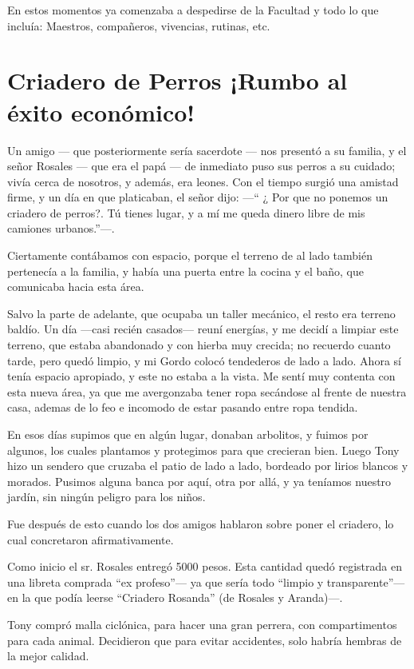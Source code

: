 \documentclass[letterpaper, 12pt]{book}
\begin{document}
En estos momentos ya comenzaba a despedirse de la Facultad y todo lo que incluía: Maestros, compañeros, vivencias, rutinas, etc.

\chapter{Criadero de Perros ¡Rumbo al éxito económico!}
Un amigo --- que posteriormente sería sacerdote --- nos presentó a su familia, y el señor Rosales --- que era el papá --- de inmediato puso sus perros a su cuidado; vivía cerca de nosotros, y además, era leones. Con el tiempo surgió una amistad firme, y un día en  que platicaban, el señor dijo: ---`` ¿ Por que no ponemos un criadero de perros?. Tú tienes lugar, y a mí me queda dinero libre de mis camiones urbanos.''---.

Ciertamente contábamos con espacio, porque el terreno de al lado también pertenecía a la familia, y había una puerta entre la cocina y el baño, que comunicaba hacia esta área.

Salvo la parte de adelante, que ocupaba un taller mecánico, el resto era terreno baldío. Un día ---casi recién casados--- reuní energías, y me decidí a limpiar este terreno, que estaba abandonado y con hierba muy crecida; no recuerdo cuanto tarde, pero quedó limpio, y mi Gordo colocó tendederos de lado a lado. Ahora sí tenía espacio apropiado, y este no estaba a la vista. Me sentí muy contenta con esta nueva área, ya que me avergonzaba tener ropa secándose al frente de nuestra casa, ademas de lo feo e incomodo de estar pasando entre ropa tendida.

En esos días supimos que en algún lugar, donaban arbolitos, y fuimos por algunos, los cuales plantamos y protegimos para que crecieran bien. Luego Tony hizo un sendero que cruzaba el patio de lado a lado, bordeado por lirios blancos y morados. Pusimos alguna banca por aquí, otra por allá, y ya teníamos nuestro jardín, sin ningún peligro para los niños.

Fue después de esto cuando los dos amigos hablaron sobre poner el criadero, lo cual concretaron afirmativamente.

Como inicio el sr. Rosales entregó 5000 pesos. Esta cantidad quedó registrada en una libreta comprada ``ex profeso''--- ya que sería todo ``limpio y transparente''--- en la que podía leerse ``Criadero Rosanda'' (de Rosales y Aranda)---.

Tony compró malla ciclónica, para hacer una gran perrera, con compartimentos para cada animal. Decidieron que para evitar accidentes, solo habría hembras de la mejor calidad.
\end{document}
